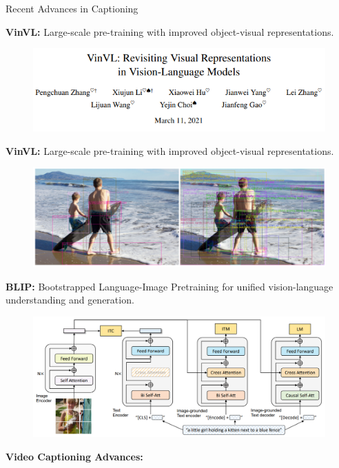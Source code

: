 \begin{frame}[allowframebreaks]{Recent Advances in Captioning}
\begin{figure}
    \end{figure}
\framebreak
    \textbf{VinVL:} Large-scale pre-training with improved object-visual representations.
    \begin{figure}
        \centering
        \includegraphics[width=1\textwidth,height=0.8\textheight,keepaspectratio]{images/vision+text/captioning-vinvl.png}
    \end{figure}
\framebreak
    \textbf{VinVL:} Large-scale pre-training with improved object-visual representations.
    \begin{figure}
        \centering
        \includegraphics[width=1\textwidth,height=0.8\textheight,keepaspectratio]{images/vision+text/captioning-vinvl-2.png}
    \end{figure}
\framebreak
    \textbf{BLIP:} Bootstrapped Language-Image Pretraining for unified vision-language understanding and generation.
    \begin{figure}
        \centering
        \includegraphics[width=1\textwidth,height=0.8\textheight,keepaspectratio]{images/vision+text/captioning-blip.png}
    \end{figure}
\framebreak
    \textbf{Video Captioning Advances:}

\end{frame}
